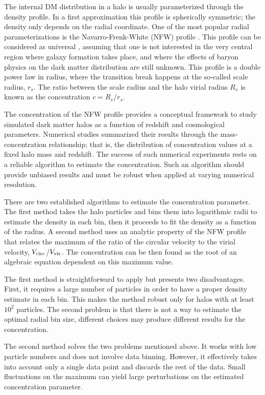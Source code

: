 \documentclass{emulateapj}
\begin{document}
The internal DM distribution in a halo is usually parameterized
through the density profile.  
In a first approximation this profile is spherically symmetric; the
density only depends on the radial coordinate.  
One of the most popular radial parameterizations is the
Navarro-Frenk-White (NFW) profile \citep{NFW}.   
This profile can be considered as universal \citep{Navarro2010}, assuming that 
one is not interested in the very central region where galaxy
formation takes place, and where the effects of baryon physics on the
dark matter distribution are still unknown. 
This profile is a double power law in radius, where the transition
break happens at the so-called scale radius, $r_s$.  
The ratio between the scale radius and the halo virial radius $R_v$ is
known as the concentration $c=R_v/r_s$. 


The concentration of the NFW profile provides a conceptual framework
to study simulated dark matter halos as a function of redshift and
cosmological parameters.  
Numerical studies
\citep{Neto2007,Maccio2008,Duffy2008,Munoz2011,Prada2012,Ludlow2014,Ludlow2016,Klypin2016}
summarized their results through the mass-concentration
relationship; that is, the distribution of concentration values at a
fixed halo mass and redshift.  
The success of such numerical experiments rests on a reliable
algorithm to estimate the concentration.  
Such an algorithm should provide unbiased results and must be robust
when applied at varying numerical resolution. 

There are two established algorithms to estimate the concentration
parameter.
The first method takes the halo particles and bins them into
logarithmic radii to estimate the density in each bin, then it
proceeds to fit the density as a function of the radius.  
A second method uses an analytic property of the NFW profile that
relates the maximum of the ratio of the circular velocity to the
virial velocity, $V_{\rm circ}$/$V_{\rm   vir}$.  The concentration
can be then found as the root of an algebraic equation dependent on
this maximum value. 

The first method is straightforward to apply but presents two
disadvantages.  First, it requires a large number of particles in
order to have a proper density estimate in each bin.  This makes the
method robust only for halos with at least $10^2$ particles.  The
second problem is that there is not a way to estimate the optimal
radial bin size, different choices may produce different results for
the concentration.

The second method solves the two problems mentioned above.  
It works with low particle numbers and does not involve data binning.  
However, it effectively takes into account only a single data point
and discards the rest of the data.
Small fluctuations on the maximum can yield large perturbations on the
estimated concentration parameter.
\end{document}
